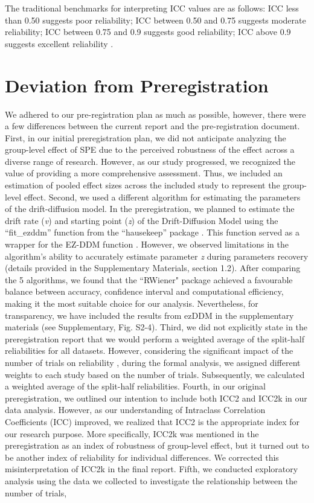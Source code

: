 \documentclass[sn-apa]{sn-jnl}%
\theoremstyle{thmstyleone}%
\theoremstyle{thmstyletwo}%
\theoremstyle{thmstylethree}%
\begin{document}
The traditional benchmarks for interpreting ICC values are as follows: ICC less than 0.50 suggests poor reliability; ICC between 0.50 and 0.75 suggests moderate reliability; ICC between 0.75 and 0.9 suggests good reliability; ICC above 0.9 suggests excellent reliability \parencite{cicchetti1981developing,kupper2020on}.
\newline
\section{Deviation from Preregistration}\label{sec:deviation}

We adhered to our pre-registration plan as much as possible, however, there were a few differences between the current report and the pre-registration document. First, in our initial preregistration plan, we did not anticipate analyzing the group-level effect of SPE due to the perceived robustness of the effect across a diverse range of research. However, as our study progressed, we recognized the value of providing a more comprehensive assessment. Thus, we included an estimation of pooled effect sizes across the included study to represent the group-level effect. Second, we used a different algorithm for estimating the parameters of the drift-diffusion model. In the preregistration, we planned to estimate the drift rate (\textit{v}) and starting point (\textit{z}) of the Drift-Diffusion Model using the ``fit\_ezddm” function from the ``hausekeep” package \parencite{lin2020strong}. This function served as a wrapper for the EZ-DDM function \parencite{wagenmakers2007an}. However, we observed limitations in the algorithm's ability to accurately estimate parameter \textit{z} during parameters recovery (details provided in the Supplementary Materials, section 1.2). After comparing the 5 algorithms, we found that the ``RWiener" package \parencite{wabersich2014rwiener} achieved a favourable balance between accuracy, confidence interval and computational efficiency, making it the most suitable choice for our analysis. Nevertheless, for transparency, we have included the results from ezDDM in the supplementary materials (see Supplementary, Fig. S2-4). Third, we did not explicitly state in the preregistration report that we would perform a weighted average of the split-half reliabilities for all datasets. However, considering the significant impact of the number of trials on reliability \parencite{kucina2023calibration}, during the formal analysis, we assigned different weights to each study based on the number of trials. Subsequently, we calculated a weighted average of the split-half reliabilities. Fourth, in our original preregistration, we outlined our intention to include both ICC2 and ICC2k in our data analysis. However, as our understanding of Intraclass Correlation Coefficients (ICC) improved, we realized that ICC2 is the appropriate index for our research purpose. More specifically, ICC2k was mentioned in the preregistration as an index of robustness of group-level effect, but it turned out to be another index of reliability for individual differences. We corrected this misinterpretation of ICC2k in the final report. Fifth, we conducted exploratory analysis using the data we collected to investigate the relationship between the number of trials, 
\end{document}
